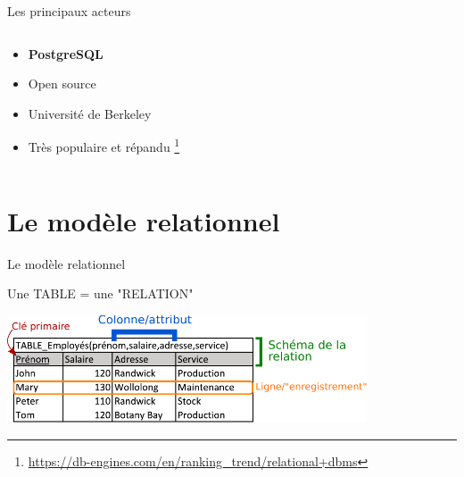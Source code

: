 \documentclass[xetex,dvipsnames]{beamer}
\begin{document}
\begin{frame}{Les principaux acteurs}
\begin{columns}
\begin{column}{0.5\textwidth}
\begin{center}
	    \end{center}
		\begin{itemize}
			\item \textbf{PostgreSQL}
			\item Open source
			\item Université de Berkeley
			\item Très populaire et répandu \footnote{{\tiny \url{https://db-engines.com/en/ranking_trend/relational+dbms}}}
		\end{itemize} 
	    \end{column}

    \end{columns}
\end{frame}



\section{Le modèle relationnel}
\begin{frame}[t]{Le modèle relationnel}
		\begin{center}
			Une TABLE = une "RELATION"
	    \end{center}
			\vspace{0.3em}
	    	\includegraphics[width=0.8\textwidth]{./figures/relation.pdf}
	    	\vspace{0.3em}

\end{frame}
\end{document}
